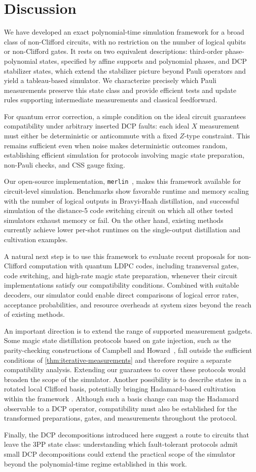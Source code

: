 \section{Discussion}
\label{sec:discussion}

We have developed an exact polynomial-time simulation framework for a broad class of non-Clifford circuits, with no restriction on the number of logical qubits or non-Clifford gates.
It rests on two equivalent descriptions: third-order phase-polynomial states, specified by affine supports and polynomial phases, and DCP stabilizer states, which extend the stabilizer picture beyond Pauli operators and yield a tableau-based simulator.
We characterize precisely which Pauli measurements preserve this state class and provide efficient tests and update rules supporting intermediate measurements and classical feedforward.

For quantum error correction, a simple condition on the ideal circuit guarantees compatibility under arbitrary inserted DCP faults: each ideal $X$ measurement must either be deterministic or anticommute with a fixed $Z$-type constraint.
This remains sufficient even when noise makes deterministic outcomes random, establishing efficient simulation for protocols involving magic state preparation, non-Pauli checks, and CSS gauge fixing.

Our open-source implementation, \texttt{merlin}~\cite{koch2026merlin}, makes this framework available for circuit-level simulation.
Benchmarks show favorable runtime and memory scaling with the number of logical outputs in Bravyi-Haah distillation, and successful simulation of the distance-5 code switching circuit on which all other tested simulators exhaust memory or fail.
On the other hand, existing methods currently achieve lower per-shot runtimes on the single-output distillation and cultivation examples.

A natural next step is to use this framework to evaluate recent proposals for non-Clifford computation with quantum LDPC codes, including transversal gates, code switching, and high-rate magic state preparation, whenever their circuit implementations satisfy our compatibility conditions.
Combined with suitable decoders, our simulator could enable direct comparisons of logical error rates, acceptance probabilities, and resource overheads at system sizes beyond the reach of existing methods.

An important direction is to extend the range of supported measurement gadgets.
Some magic state distillation protocols based on gate injection, such as the parity-checking constructions of Campbell and Howard~\cite{campbell2018magic}, fall outside the sufficient conditions of  \cref{thm:iterative-measurements} and therefore require a separate compatibility analysis.
Extending our guarantees to cover these protocols would broaden the scope of the simulator.
Another possibility is to describe states in a rotated local Clifford basis, potentially bringing Hadamard-based cultivation within the framework \cite{chamberland2020very,sahay2026foldtransversal}.
Although such a basis change can map the Hadamard observable to a DCP operator, compatibility must also be established for the transformed preparations, gates, and measurements throughout the protocol.

Finally, the DCP decompositions introduced here suggest a route to circuits that leave the 3PP state class: understanding which fault-tolerant protocols admit small DCP decompositions could extend the practical scope of the simulator beyond the polynomial-time regime established in this work.
